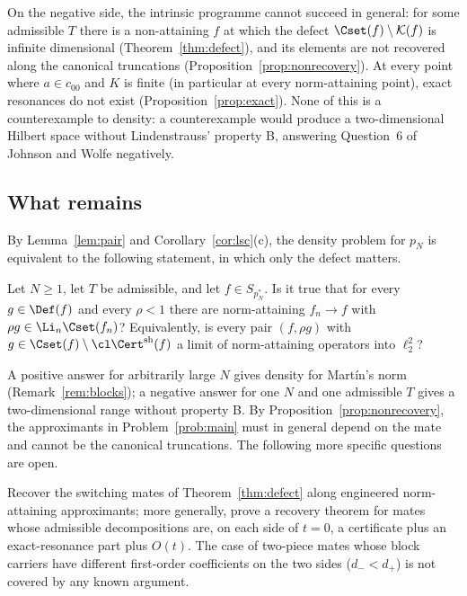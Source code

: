 On the negative side, the intrinsic programme cannot succeed in general:
for some admissible $T$ there is a non-attaining $f$ at which the defect
$\Cset(f)\setminus\mathcal K(f)$ is infinite dimensional
(Theorem~\ref{thm:defect}), and its elements are not recovered along the
canonical truncations (Proposition~\ref{prop:nonrecovery}).  At every point
where $a\in c_{00}$ and $K$ is finite (in particular at every norm-attaining
point), exact resonances do not exist (Proposition~\ref{prop:exact}).  None
of this is a counterexample to density: a counterexample would produce a
two-dimensional Hilbert space without Lindenstrauss' property B, answering
Question~6 of Johnson and Wolfe \cite{JW} negatively.

\subsection{What remains}
By Lemma~\ref{lem:pair} and Corollary~\ref{cor:lsc}(c), the density problem
for $p_N$ is equivalent to the following statement, in which only the defect
matters.

\begin{problem}\label{prob:main}
Let $N\ge1$, let $T$ be admissible, and let $f\in S_{p_N^*}$.  Is it true
that for every $g\in\Def(f)$ and every $\rho<1$ there are norm-attaining
$f_n\to f$ with $\rho g\in\Li_n\Cset(f_n)$?  Equivalently, is every pair
$(f,\rho g)$ with $g\in\Cset(f)\setminus\cl\Cert^{\rm sh}(f)$ a limit of
norm-attaining operators into $\ell_2^2$?
\end{problem}

A positive answer for arbitrarily large $N$ gives density for Mart\'in's
norm (Remark~\ref{rem:blocks}); a negative answer for one $N$ and one
admissible $T$ gives a two-dimensional range without property B.  By
Proposition~\ref{prop:nonrecovery}, the approximants in
Problem~\ref{prob:main} must in general depend on the mate and cannot be
the canonical truncations.  The following more specific questions are open.

\begin{problem}\label{prob:resonant}
Recover the switching mates of Theorem~\ref{thm:defect} along engineered
norm-attaining approximants; more generally, prove a recovery theorem for
mates whose admissible decompositions are, on each side of $t=0$, a
certificate plus an exact-resonance part plus $O(t)$.  The case of two-piece
mates whose block carriers have different first-order coefficients on the
two sides ($d_-<d_+$) is not covered by any known argument.
\end{problem}

